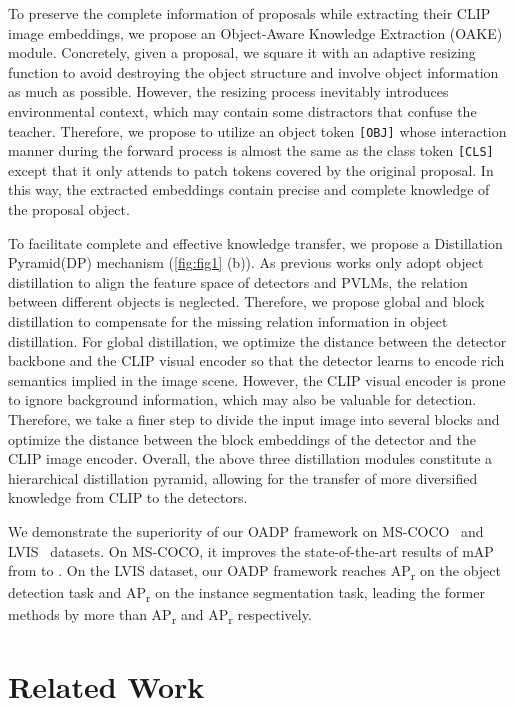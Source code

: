 \documentclass[10pt,twocolumn,letterpaper]{article}
\makeatletter
\def\OAKE{Object-Aware Knowledge Extraction}
\def\DP{Distillation Pyramid}
\newcommand{\@mAP}[2]{mAP}
\newcommand{\@AP}[1]{AP\textsubscript{#1}}
\newcommand{\mAPN}[1]{\@mAP{N}{#1}}
\def\APr{\@AP{r}}
\makeatother
\begin{document}
To preserve the complete information of proposals while extracting their CLIP image embeddings,
we propose an \OAKE{} (OAKE) module.
Concretely, given a proposal, we square it with an adaptive resizing function to avoid destroying the object structure and involve object information as much as possible.
However, the resizing process inevitably introduces environmental context, which may contain some distractors that confuse the teacher.
Therefore, we propose to utilize an object token \texttt{[OBJ]} whose interaction manner during the forward process is almost the same as the class token \texttt{[CLS]} except that it only attends to patch tokens covered by the original proposal.
In this way, the extracted embeddings contain precise and complete
knowledge of the proposal object.



To facilitate complete and effective knowledge transfer, we propose a \DP (DP) mechanism (\cref{fig:fig1} (b)).
As previous works only adopt object distillation to align the feature space of detectors and PVLMs, the relation between different objects is neglected.
Therefore, we propose global and block distillation to compensate for the missing relation information in object distillation.
For global distillation, we optimize the  distance between the detector backbone and the CLIP visual encoder so that the detector learns to encode rich semantics implied in the image scene.
However, the CLIP visual encoder is prone to ignore background information, which may also be valuable for detection.
Therefore, we take a finer step to divide the input image into several blocks and optimize the  distance between the block embeddings of the detector and the CLIP image encoder.
Overall, the above three distillation modules constitute a hierarchical distillation pyramid, allowing for the transfer of more diversified knowledge from CLIP to the detectors.

We demonstrate the superiority of our OADP framework on MS-COCO~\cite{coco} and LVIS~\cite{lvis} datasets.
On MS-COCO, it improves the state-of-the-art results of \mAPN{50} from  to .
On the LVIS dataset, our OADP framework reaches  \APr{} on the object detection task and  \APr{} on the instance segmentation task, leading the former methods by more than  \APr{} and  \APr{} respectively.



 
\section{Related Work}
\end{document}
